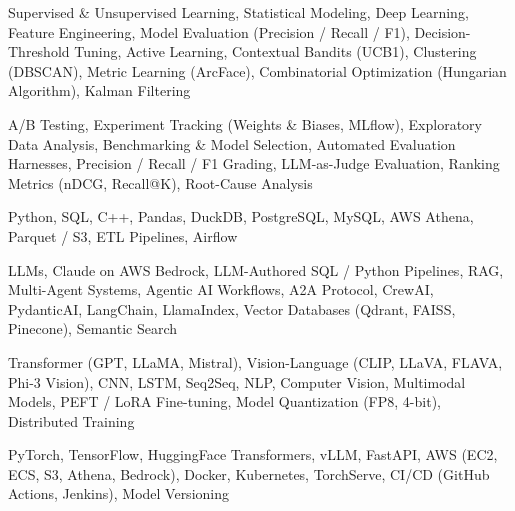 \documentclass[letter,10pt]{article}
\begin{document}
 Supervised \& Unsupervised Learning, Statistical Modeling, Deep Learning, Feature Engineering, Model Evaluation (Precision / Recall / F1), Decision-Threshold Tuning, Active Learning, Contextual Bandits (UCB1), Clustering (DBSCAN), Metric Learning (ArcFace), Combinatorial Optimization (Hungarian Algorithm), Kalman Filtering\par\vspace{2pt}

 A/B Testing, Experiment Tracking (Weights \& Biases, MLflow), Exploratory Data Analysis, Benchmarking \& Model Selection, Automated Evaluation Harnesses, Precision / Recall / F1 Grading, LLM-as-Judge Evaluation, Ranking Metrics (nDCG, Recall@K), Root-Cause Analysis\par\vspace{2pt}

 Python, SQL, C++, Pandas, DuckDB, PostgreSQL, MySQL, AWS Athena, Parquet / S3, ETL Pipelines, Airflow\par\vspace{2pt}

 LLMs, Claude on AWS Bedrock, LLM-Authored SQL / Python Pipelines, RAG, Multi-Agent Systems, Agentic AI Workflows, A2A Protocol, CrewAI, PydanticAI, LangChain, LlamaIndex, Vector Databases (Qdrant, FAISS, Pinecone), Semantic Search\par\vspace{2pt}

 Transformer (GPT, LLaMA, Mistral), Vision-Language (CLIP, LLaVA, FLAVA, Phi-3 Vision), CNN, LSTM, Seq2Seq, NLP, Computer Vision, Multimodal Models, PEFT / LoRA Fine-tuning, Model Quantization (FP8, 4-bit), Distributed Training\par\vspace{2pt}

 PyTorch, TensorFlow, HuggingFace Transformers, vLLM, FastAPI, AWS (EC2, ECS, S3, Athena, Bedrock), Docker, Kubernetes, TorchServe, CI/CD (GitHub Actions, Jenkins), Model Versioning
\end{document}
